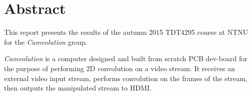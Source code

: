 \chapter*{Abstract}
This report presents the results of the autumn 2015 TDT4295 course at NTNU for the \textit{Camvolution} group.

\textit{Camvolution} is a computer designed and built from scratch PCB dev-board for the purpose of performing 2D convolution on a video stream.
It receives an external video input stream,
performs convolution on the frames of the stream,
then outputs the manipulated stream to HDMI.
